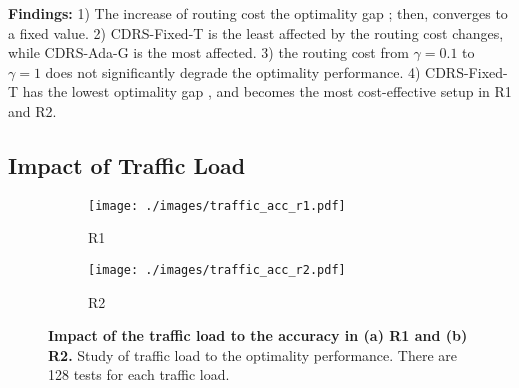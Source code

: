 


\textbf{Findings:} 1) The increase of routing cost  the optimality gap ; then,  converges to a fixed value. 2) CDRS-Fixed-T is the least affected by the routing cost changes, while CDRS-Ada-G is the most affected. 3)  the routing cost from $\gamma = 0.1$ to $\gamma = 1$ does not significantly degrade the optimality performance. 4) CDRS-Fixed-T has the lowest optimality gap  , and becomes the most cost-effective setup in R1 and R2. 
%

\vspace{-2mm}
\subsection{Impact of Traffic Load}
\vspace{-1mm}

\begin{figure*}[t] 
	\centering
	\begin{subfigure}[t]{.99\textwidth}
		\centering
		\texttt{[image: ./images/traffic\_acc\_r1.pdf]}
		\small\caption{\small R1}
	\end{subfigure}
	\begin{subfigure}[t]{.99\textwidth}
		\centering
		\texttt{[image: ./images/traffic\_acc\_r2.pdf]}
		\small\caption{\small R2}
	\end{subfigure}		
	\caption{\small \textbf{Impact of the traffic load to the accuracy in (a) R1 and (b) R2.} Study of traffic load to the optimality performance. There are 128 tests for each traffic load. } \label{fig:traffic_acc}
	\vspace{-3mm}
\end{figure*}


